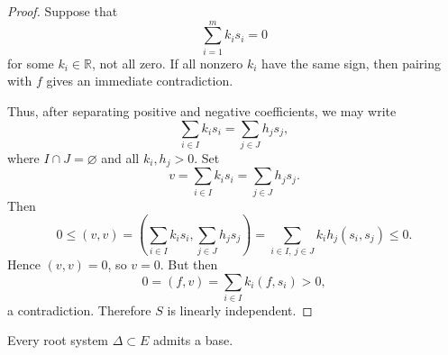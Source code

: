 \begin{proof}
    Suppose that
    \[
        \sum_{i=1}^m k_i s_i=0
    \]
    for some \(k_i\in\mathbb{R}\), not all zero. If all nonzero \(k_i\) have the
    same sign, then pairing with \(f\) gives an immediate contradiction.

    Thus, after separating positive and negative coefficients, we may write
    \[
        \sum_{i\in I} k_i s_i
        =
        \sum_{j\in J} h_j s_j,
    \]
    where \(I\cap J=\varnothing\) and all \(k_i,h_j>0\). Set
    \[
        v=\sum_{i\in I} k_i s_i
        =
        \sum_{j\in J} h_j s_j.
    \]
    Then
    \[
        0\leq (v,v)
        =
        \left(
        \sum_{i\in I} k_i s_i,
        \sum_{j\in J} h_j s_j
        \right)
        =
        \sum_{i\in I,\ j\in J} k_i h_j (s_i,s_j)
        \leq 0.
    \]
    Hence \((v,v)=0\), so \(v=0\). But then
    \[
        0=(f,v)=\sum_{i\in I} k_i(f,s_i)>0,
    \]
    a contradiction. Therefore \(S\) is linearly independent.
\end{proof}

\begin{theorem}
    Every root system \(\Delta\subset E\) admits a base.
\end{theorem}

